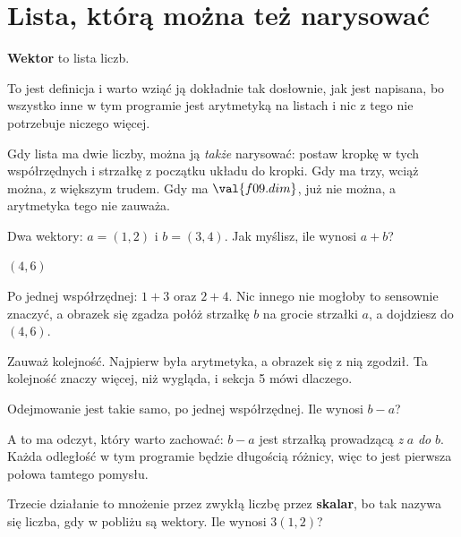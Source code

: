 \section{Lista, którą można też narysować}
\label{sec:F09-list}

\begin{fr}
\textbf{Wektor} to lista liczb.

To jest definicja i warto wziąć ją dokładnie tak dosłownie, jak jest
napisana, bo wszystko inne w tym programie jest arytmetyką na listach i nic
z tego nie potrzebuje niczego więcej.

Gdy lista ma dwie liczby, można ją \emph{także} narysować: postaw kropkę w
tych współrzędnych i strzałkę z początku układu do kropki. Gdy ma trzy, wciąż
można, z większym trudem. Gdy ma $\val{f09.dim}$, już nie można, a arytmetyka
tego nie zauważa.

Dwa wektory: $a = (1, 2)$ i $b = (3, 4)$. Jak myślisz, ile wynosi $a + b$?
\nextframe
\end{fr}

\begin{fr}
\begin{ansblock}
$(4, 6)$
\end{ansblock}

Po jednej współrzędnej: $1 + 3$ oraz $2 + 4$. Nic innego nie mogłoby to
sensownie znaczyć, a obrazek się zgadza \dash{} połóż strzałkę $b$ na grocie
strzałki $a$, a dojdziesz do $(4, 6)$.

Zauważ kolejność. Najpierw była arytmetyka, a obrazek się z nią zgodził. Ta
kolejność znaczy więcej, niż wygląda, i sekcja 5 mówi dlaczego.

Odejmowanie jest takie samo, po jednej współrzędnej. Ile wynosi $b - a$?
\nextframe
\end{fr}

\begin{fr}
A to ma odczyt, który warto zachować: $b - a$ jest strzałką prowadzącą
\emph{z} $a$ \emph{do} $b$. Każda odległość w tym programie będzie długością
różnicy, więc to jest pierwsza połowa tamtego pomysłu.

Trzecie działanie to mnożenie przez zwykłą liczbę \dash{} przez
\textbf{skalar}, bo tak nazywa się liczba, gdy w pobliżu są wektory. Ile
wynosi $3(1, 2)$?
\nextframe
\end{fr}

